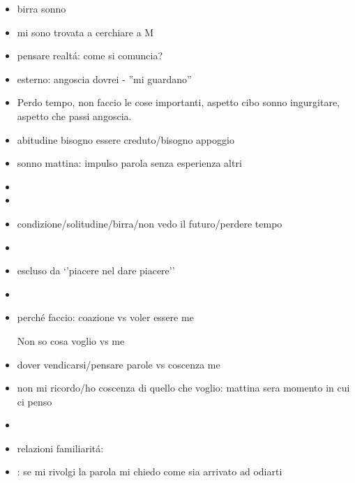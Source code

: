 \begin{itemize}

\item birra sonno
\item mi sono trovata a cerchiare a M

\item pensare realt\'a: come si comuncia?

\item esterno: angoscia dovrei - ''mi guardano''

\item {} Perdo tempo, non faccio le cose importanti, aspetto cibo sonno ingurgitare, aspetto che passi angoscia.

\item abitudine bisogno essere creduto/bisogno appoggio
\item sonno mattina: impulso parola senza esperienza altri

\item {}

\item {}

\item condizione/solitudine/birra/non vedo il futuro/perdere tempo

\item {}

\item escluso da ‘’piacere nel dare piacere’’

\item {}

\item perch\'e faccio: coazione vs voler essere me

Non so cosa voglio vs me

\item dover vendicarsi/pensare parole vs coscenza me

\item non mi ricordo/ho coscenza di quello che voglio: mattina sera momento in cui ci penso 

\item {}

\item relazioni familiarit\'a: 

\item {}: se mi rivolgi la parola mi chiedo come sia arrivato ad odiarti


\end{itemize}

